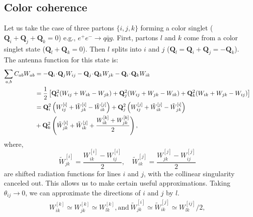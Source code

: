 
\subsection{Color coherence}
\label{sec:colorCoherence}
Let us take the case of three partons \(\{i,j,k\}\) forming a color singlet (\(\mathbf{Q}_i + \mathbf{Q}_j +\mathbf{Q}_k = 0\)) e.g., \(e^+e^-\to q\bar{q} g\). First, partons \(l\) and \(k\) come from a color singlet state (\(\mathbf{Q}_l +\mathbf{Q}_k = 0\)). Then \(l\) splits into \(i\) and \(j\) (\(\mathbf{Q}_l = \mathbf{Q}_i + \mathbf{Q}_j = -\mathbf{Q}_k\)). The antenna function for this state is:
\begin{align}
	\label{eq:threePartonW}
	\sum_{a,b}C_{ab}W_{ab} & = -\mathbf{Q}_i\!\cdot\!\mathbf{Q}_jW_{ij} -\mathbf{Q}_j\!\cdot\!\mathbf{Q}_kW_{jk} -\mathbf{Q}_i\!\cdot\!\mathbf{Q}_kW_{ik} \notag                                                   \\
	                       & = \frac{1}{2}\left[\mathbf{Q}_i^2(W_{ij} + W_{ik} - W_{jk}) + \mathbf{Q}_j^2(W_{ij} + W_{jk} - W_{ik}) + \mathbf{Q}_k^2(W_{ik} + W_{jk} - W_{ij})\right]\notag                        \\
	                       & =\mathbf{Q}_i^2\left(W_{ij}^{[i]} + \tilde{W}_{jk}^{[i]} - \tilde{W}_{ik}^{[j]}\right) + \mathbf{Q}_j^2\left(W_{ij}^{[j]} + \tilde{W}_{ik}^{[j]} - \tilde{W}_{jk}^{[i]}\right) \notag \\
	                       & + \mathbf{Q}_k^2\left(\tilde{W}_{jk}^{[i]} + \tilde{W}_{ik}^{[j]} + \frac{W_{ik}^{[k]} + W_{jk}^{[k]} }{2}\right),
\end{align}
where,
\begin{equation}
	\tilde{W}_{jk}^{[i]} = \frac{W^{[i]}_{ik} - W^{[i]}_{ij}}{2},\quad \tilde{W}_{ik}^{[j]} = \frac{W^{[j]}_{jk} - W^{[j]}_{ij}}{2}
\end{equation}
are shifted radiation functions for lines \(i\) and \(j\), with the collinear singularity canceled out. This allows us to make certain useful approximations. Taking \(\theta_{ij}\to0\), we can approximate the directions of \(i\) and \(j\) by \(l\).
\begin{align}
	W_{ik}^{[k]} \simeq W_{jk}^{[k]} \simeq W_{lk}^{[k]},\text{and}~\tilde{W}_{jk}^{[i]} \simeq \tilde{W}_{ik}^{[j]} \simeq W_{lk}^{[ij]}/2,
\end{align}
